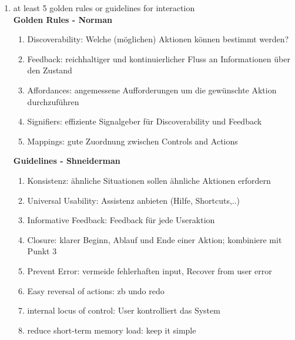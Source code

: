 \begin{enumerate}
	\item at least 5 golden rules or guidelines for interaction\\
	\textbf{Golden Rules - Norman}
	\begin{enumerate}
		\item Discoverability: Welche (möglichen) Aktionen können bestimmt werden?
		\item Feedback: reichhaltiger und kontinuierlicher Fluss an Informationen über den Zustand
		\item Affordances: angemessene Aufforderungen um die gewünschte Aktion durchzuführen
		\item Signifiers: effiziente Signalgeber für Discoverability und Feedback
		\item Mappings: gute Zuordnung zwischen Controls and Actions
	\end{enumerate}
	\textbf{Guidelines - Shneiderman}
	\begin{enumerate}
		\item Konsistenz: ähnliche Situationen sollen ähnliche Aktionen erfordern
		\item Universal Usability: Assistenz anbieten (Hilfe, Shortcuts,..)
		\item Informative Feedback: Feedback für jede Useraktion
		\item Closure: klarer Beginn, Ablauf und Ende einer Aktion; kombiniere mit Punkt 3
		\item Prevent Error: vermeide fehlerhaften input, Recover from user error
		\item Easy reversal of actions: zb undo redo
		\item internal locus of control: User kontrolliert das System
		\item reduce short-term memory load: keep it simple
	\end{enumerate}
\end{enumerate}

